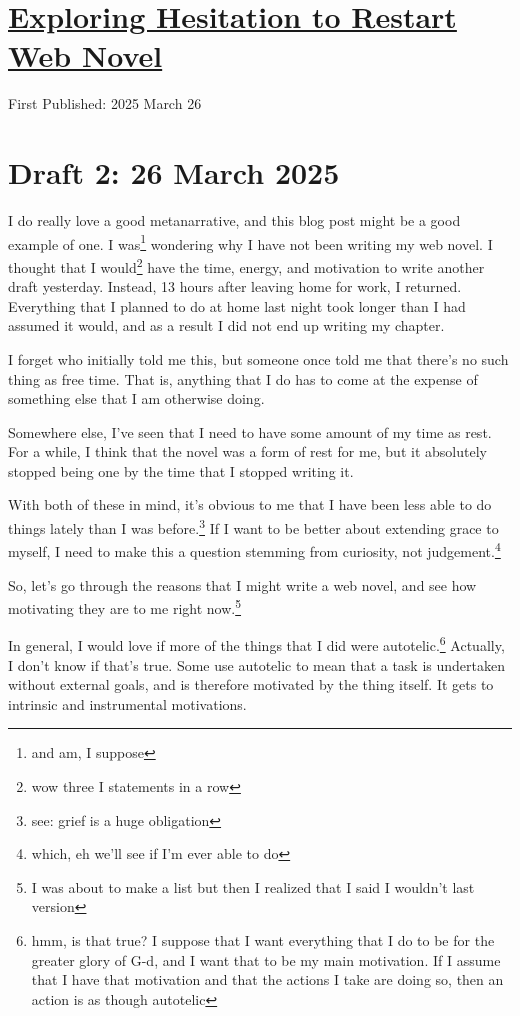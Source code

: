 \documentclass[12pt]{article}[titlepage]
\renewcommand{\,}{\textsuperscript{,}}
\begin{document}
\doublespacing
\section{\href{why-not-write-web-novel.html}{Exploring Hesitation to Restart Web Novel}}
First Published: 2025 March 26

\section{Draft 2: 26 March 2025}  
I do really love a good metanarrative, and this blog post might be a good example of one.  
I was\footnote{and am, I suppose} wondering why I have not been writing my web novel.  
I thought that I would\footnote{wow three I statements in a row} have the time, energy, and motivation to write another draft yesterday.  
Instead, 13 hours after leaving home for work, I returned.  
Everything that I planned to do at home last night took longer than I had assumed it would, and as a result I did not end up writing my chapter.

I forget who initially told me this, but someone once told me that there's no such thing as free time.  
That is, anything that I do has to come at the expense of something else that I am otherwise doing.

Somewhere else, I've seen that I need to have some amount of my time as rest.  
For a while, I think that the novel was a form of rest for me, but it absolutely stopped being one by the time that I stopped writing it.

With both of these in mind, it's obvious to me that I have been less able to do things lately than I was before.\footnote{see: grief is a huge obligation}  
If I want to be better about extending grace to myself, I need to make this a question stemming from curiosity, not judgement.\footnote{which, eh we'll see if I'm ever able to do}

So, let's go through the reasons that I might write a web novel, and see how motivating they are to me right now.\footnote{I was about to make a list but then I realized that I said I wouldn't last version}

In general, I would love if more of the things that I did were autotelic.\footnote{hmm, is that true? I suppose that I want everything that I do to be for the greater glory of G-d, and I want that to be my main motivation. If I assume that I have that motivation and that the actions I take are doing so, then an action is as though autotelic}  
Actually, I don't know if that's true.  
Some use autotelic to mean that a task is undertaken without external goals, and is therefore motivated by the thing itself.  
It gets to intrinsic and instrumental motivations.
\end{document}
